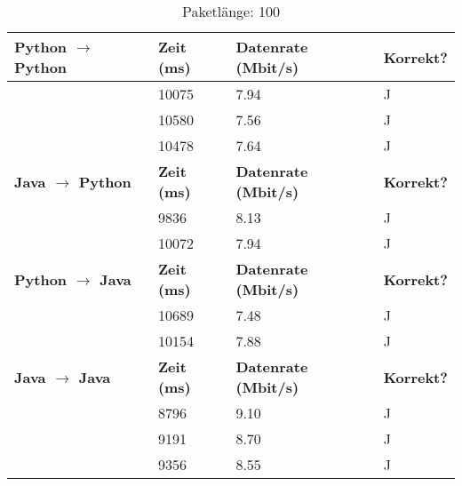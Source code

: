\documentclass{article}
\begin{document}
    \begin{table}[]
        \caption{Paketlänge: 100}
        \label{tab:my-tablev2_100}
        \begin{tabular}{|l|l|l|l|}
            \hline
            \textbf{Python $\rightarrow$ Python} & \textbf{Zeit (ms)} & \textbf{Datenrate (Mbit/s)} & \textbf{Korrekt?} \\ \hline
            & 10075      & 7.94         & J        \\ \cline{2-4}
            & 10580      & 7.56         & J        \\ \cline{2-4}
            & 10478      & 7.64         & J        \\ \hline
            \textbf{Java $\rightarrow$ Python}   & \textbf{Zeit (ms)} & \textbf{Datenrate (Mbit/s)} & \textbf{Korrekt?} \\ \hline
            & 9836       & 8.13         & J        \\ \cline{2-4}
            & 10072      & 7.94         & J        \\ \hline
            \textbf{Python $\rightarrow$ Java}  & \textbf{Zeit (ms)} & \textbf{Datenrate (Mbit/s)} & \textbf{Korrekt?} \\ \hline
            & 10689      & 7.48         & J        \\ \cline{2-4}
            & 10154      & 7.88         & J        \\ \hline
            \textbf{Java $\rightarrow$ Java}   & \textbf{Zeit (ms)} & \textbf{Datenrate (Mbit/s)} & \textbf{Korrekt?} \\ \hline
            & 8796       & 9.10         & J        \\ \cline{2-4}
            & 9191       & 8.70         & J        \\ \cline{2-4}
            & 9356       & 8.55         & J        \\ \hline
        \end{tabular}
    \end{table}
\end{document}
